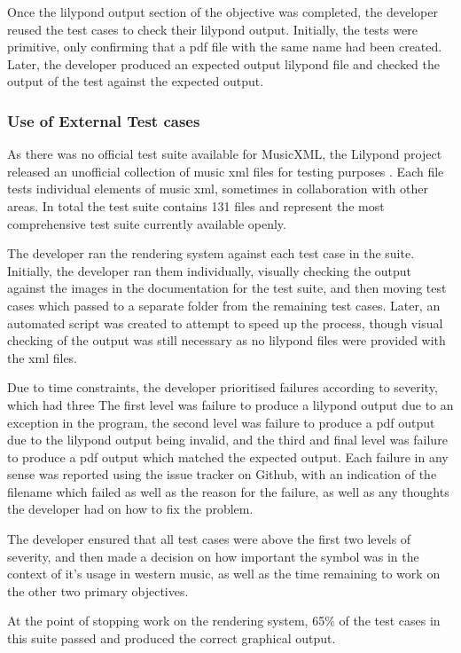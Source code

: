 Once the lilypond output section of the objective was completed, the developer reused the test cases to check their lilypond output. Initially, the tests were primitive, only confirming that a pdf file with the same name had been created. Later, the developer produced an expected output lilypond file and checked the output of the test against the expected output.

\subsubsection{Use of External Test cases}
As there was no official test suite available for MusicXML, the Lilypond project released an unofficial collection of music xml files for testing purposes \parencite{LilypondTestcase}. Each file tests individual elements of music xml, sometimes in collaboration with other areas. In total the test suite contains 131 files and represent the most comprehensive test suite currently available openly.

The developer ran the rendering system against each test case in the suite. Initially, the developer ran them individually, visually checking the output against the images in the documentation for the test suite, and then moving test cases which passed to a separate folder from the remaining test cases. Later, an automated script was created to attempt to speed up the process, though visual checking of the output was still necessary as no lilypond files were provided with the xml files.

Due to time constraints, the developer prioritised failures according to severity, which had three The first level was failure to produce a lilypond output due to an exception in the program, the second level was failure to produce a pdf output due to the lilypond output being invalid, and the third and final level was failure to produce a pdf output which matched the expected output. Each failure in any sense was reported using the issue tracker on Github, with an indication of the filename which failed as well as the reason for the failure, as well as any thoughts the developer had on how to fix the problem.
 
The developer ensured that all test cases were above the first two levels of severity, and then made a decision on how important the symbol was in the context of it's usage in western music, as well as the time remaining to work on the other two primary objectives.

At the point of stopping work on the rendering system, 65$\%$ of the test cases in this suite passed and produced the correct graphical output.

